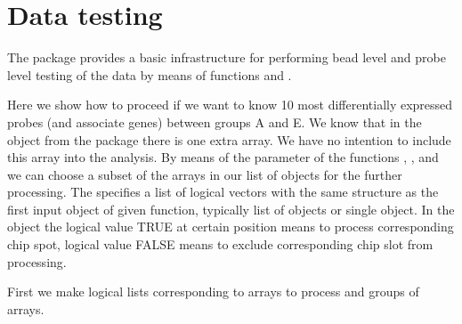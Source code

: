 \section{Data testing}
The package  provides a basic infrastructure for performing bead level and probe level testing of the data by means of functions  and .

Here we show how to proceed if we want to know 10 most differentially expressed probes (and associate genes) between groups A and E. We know that in the object  from the  package there is one extra array. We have no intention to include this array into the analysis. By means of the parameter  of the functions , ,  and  we can choose a subset of the arrays in our list of  objects for the further processing. The  specifies a list of logical vectors with the same structure as the first input object of given function, typically list of  objects or single  object. In the  object the logical value TRUE at certain position means to process corresponding chip spot, logical value FALSE means to exclude corresponding chip slot from processing.

First we make logical lists corresponding to arrays to process and groups of arrays. 